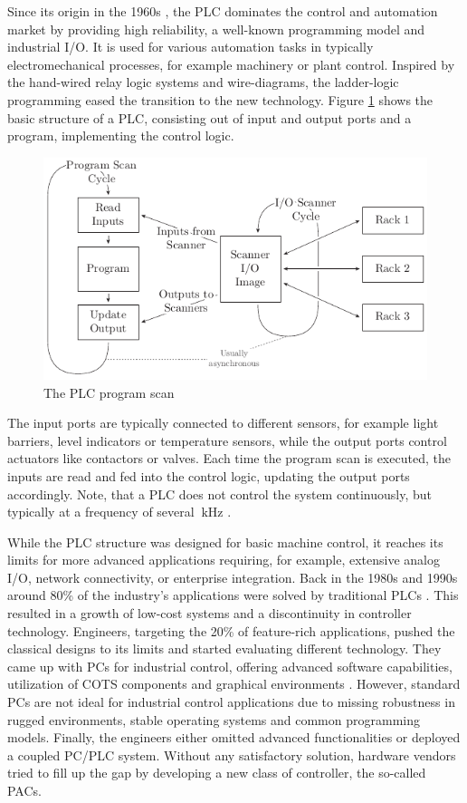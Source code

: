 Since its origin in the 1960s \citep{par99}, the \ac{PLC} dominates the
control and automation market by providing high reliability, a well-known
programming model and industrial I/O. It is used for various automation tasks
in typically electromechanical processes, for example machinery or plant
control. Inspired by the hand-wired relay logic systems and wire-diagrams, the
ladder-logic programming eased the transition to the new technology. Figure
\ref{fig:plc} shows the basic structure of a \ac{PLC}, consisting out of input
and output ports and a program, implementing the control logic.
\begin{figure}[tb]
	\centering
	\includegraphics{../figures/plc}
	\caption{The \acs{PLC} program scan \citep[adapted from][]{par99}}
	\label{fig:plc}
\end{figure}
The input ports are typically connected to different sensors, for example
light barriers, level indicators or temperature sensors, while the output
ports control actuators like contactors or valves. Each time the program scan
is executed, the inputs are read and fed into the control logic, updating the
output ports accordingly. Note, that a \ac{PLC} does not control the system
continuously, but typically at a frequency of several $\SI{}{\kilo\hertz}$
\citep{par99}.

While the \ac{PLC} structure was designed for basic machine control, it
reaches its limits for more advanced applications requiring, for example,
extensive analog I/O, network connectivity, or enterprise integration. Back in
the 1980s and 1990s around 80\% of the industry's applications were solved by
traditional \acp{PLC} \citep{bel05}. This resulted in a growth of low-cost
systems and a discontinuity in controller technology. Engineers, targeting the
20\% of feature-rich applications, pushed the classical designs to its limits
and started evaluating different technology. They came up with \acp{PC} for
industrial control, offering advanced software capabilities, utilization of
\ac{COTS} components and graphical environments \citep{bel05}. However,
standard \acp{PC} are not ideal for industrial control applications due to
missing robustness in rugged environments, stable operating systems and common
programming models. Finally, the engineers either omitted advanced
functionalities or deployed a coupled \ac{PC}/\ac{PLC} system. Without any
satisfactory solution, hardware vendors tried to fill up the gap by developing
a new class of controller, the so-called \acp{PAC}.

